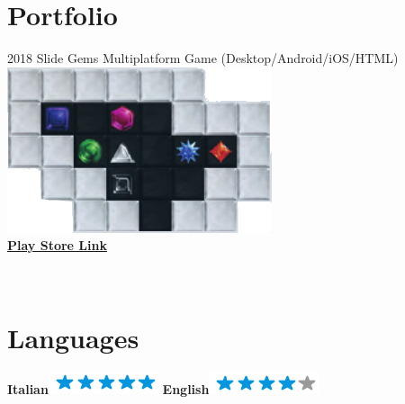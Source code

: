 \documentclass[]{friggeri-cv}
\begin{document}
\section{Portfolio}
\begin{entrylist}
  \entry
    {2018}
    {Slide Gems}
    {Multiplatform Game (Desktop/Android/iOS/HTML)}
    {{\includegraphics[scale=0.50]{img/slide_gems_snip.png}}\\\href{https://bit.ly/2Gwwct5}{\textbf{Play Store Link}}}
    
    
     
\end{entrylist}

\begin{aside}
~
~
~
    ~
    ~
  \section{Languages}
    \textbf{Italian}\includegraphics[scale=0.40]{img/5stars.png}
    \textbf{English}\includegraphics[scale=0.40]{img/4stars.png}
    ~
\end{aside}
\end{document}
